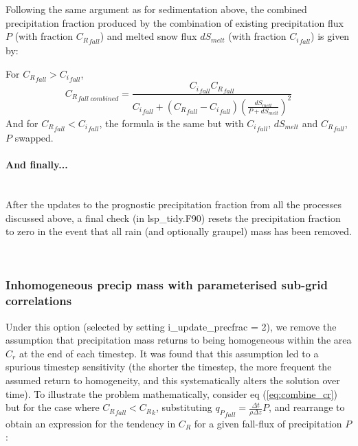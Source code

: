 \documentclass{UMDP_article}
\begin{document}
Following the same argument as for sedimentation above, the combined
precipitation fraction produced by the combination of existing precipitation
flux $P$ (with fraction ${C_R}_{fall}$) and melted snow flux $dS_{melt}$ 
(with fraction ${C_i}_{fall}$) is given by:

For ${C_R}_{fall} > {C_i}_{fall}$,
\[
{C_R}_{fall \; combined} = \frac{ {C_i}_{fall} {C_R}_{fall} }
                      { {C_i}_{fall} + \left( {C_R}_{fall} - {C_i}_{fall} \right)
                        \left( \frac{dS_{melt}}{P + dS_{melt}} \right)^2 }
\]
And for ${C_R}_{fall} < {C_i}_{fall}$, the formula is the same but with
${C_i}_{fall}$, $dS_{melt}$ and ${C_R}_{fall}$, $P$ swapped.

\paragraph{And finally...}
~\\

After the updates to the prognostic precipitation fraction from all
the processes discussed above, a final check (in lsp\_tidy.F90)
resets the precipitation fraction to zero in the event that all rain
(and optionally graupel) mass has been removed.

~\\

\subsubsection{Inhomogeneous precip mass with parameterised sub-grid
correlations}

Under this option (selected by setting i\_update\_precfrac = 2),
we remove the assumption that precipitation mass returns to being homogeneous
within the area $C_r$ at the end of each timestep.
It was found that this assumption led to a spurious timestep sensitivity
(the shorter the timestep, the more frequent the assumed return to
homogeneity, and this systematically alters the solution over time).
To illustrate the problem mathematically,
consider eq (\ref{eq:combine_cr}) but for the case where ${C_R}_{fall} < {C_R}_k$,
substituting ${q_P}_{fall} = \frac{\Delta t}{\rho \Delta z} P$,
and rearrange to obtain an expression for the tendency in $C_R$
for a given fall-flux of precipitation $P$:
\end{document}
